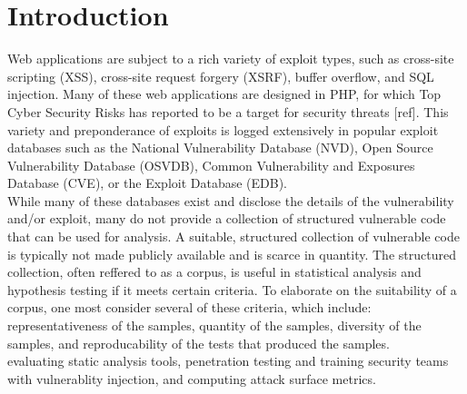 \documentclass[letterpaper,twocolumn,10pt]{article}
\begin{document}
\section{Introduction}
Web applications are subject to a rich variety of exploit types, such as cross-site scripting (XSS), cross-site request forgery (XSRF), buffer overflow, and SQL injection.  Many of these web applications are designed in PHP, for which Top Cyber Security Risks has reported to be a target for security threats [ref].  This variety and preponderance of exploits is logged extensively in popular exploit databases such as the National Vulnerability Database (NVD), Open Source Vulnerability Database (OSVDB), Common Vulnerability and Exposures Database (CVE), or the Exploit Database (EDB).\\

While many of these databases exist and disclose the details of the vulnerability and/or exploit, many do not provide a collection of structured vulnerable code that can be used for analysis.  A suitable, structured collection of vulnerable code is typically not made publicly available and is scarce in quantity.  The structured collection, often reffered to as a corpus, is useful in statistical analysis and hypothesis testing if it meets certain criteria.  To elaborate on the suitability of a corpus, one most consider several of these criteria, which include: representativeness of the samples, quantity of the samples, diversity of the samples, and reproducability of the tests that produced the samples.  \\

evaluating static analysis tools, penetration testing and training security teams with vulnerablity injection, and computing attack surface metrics.\\
\end{document}
